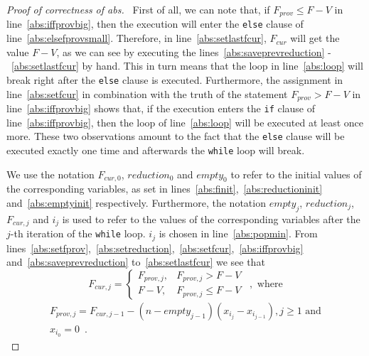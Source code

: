 \begin{proof}[Proof of correctness of abs] \
  First of all, we can note that, if $F_{prov} \leq F - V$ in line~\ref{abs:iffprovbig}, then the execution will enter the
  \texttt{else} clause of line~\ref{abs:elsefprovsmall}. Therefore, in line~\ref{abs:setlastfcur}, $F_{cur}$ will get the
  value $F - V$, as we can see by executing the lines~\ref{abs:saveprevreduction} -~\ref{abs:setlastfcur} by hand. This in
  turn means that the loop in line~\ref{abs:loop} will break right after the \texttt{else} clause is executed. Furthermore,
  the assignment in line~\ref{abs:setfcur} in combination with the truth of the statement $F_{prov} > F - V$ in
  line~\ref{abs:iffprovbig} shows that, if the execution enters the \texttt{if} clause of line~\ref{abs:iffprovbig}, then
  the loop of line~\ref{abs:loop} will be executed at least once more. These two observations amount to the fact that the
  \texttt{else} clause will be executed exactly one time and afterwards the \texttt{while} loop will break.

  We use the notation $F_{cur, 0}$, $reduction_0$ and $empty_0$ to refer to the initial values of the corresponding
  variables, as set in lines~\ref{abs:finit},~\ref{abs:reductioninit} and~\ref{abs:emptyinit} respectively. Furthermore, the
  notation $empty_j$, $reduction_j$, $F_{cur, j}$ and $i_j$ is used to refer to the values of the corresponding variables
  after the $j$-th iteration of the \texttt{while} loop. $i_j$ is chosen in line~\ref{abs:popmin}. From
  lines~\ref{abs:setfprov},~\ref{abs:setreduction},~\ref{abs:setfcur},~\ref{abs:iffprovbig} and~\ref{abs:saveprevreduction}
  to~\ref{abs:setlastfcur} we see that
  \begin{equation*}
    F_{cur, j} =
    \begin{cases}
       F_{prov, j},& F_{prov, j} > F - V \\
       F - V ,& F_{prov, j} \leq F - V
    \end{cases} \enspace, \mbox{ where}
  \end{equation*}
  \begin{equation*}
  \begin{gathered}
    F_{prov, j} = F_{cur, j-1} - \left(n - empty_{j-1}\right)\left(x_{i_j} - x_{i_{j-1}}\right), j \geq 1 \mbox{ and} \\
    x_{i_0} = 0 \enspace.
  \end{gathered}
  \end{equation*}


\end{proof}
